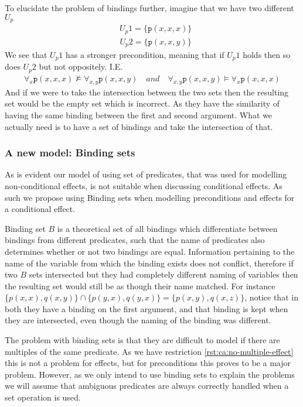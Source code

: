 \documentclass[../Master.tex]{subfiles}
\begin{document}
\begin{example}\label{ex:ca:nonbinding-intersection-model}
To elucidate the problem of bindings further, imagine that we have two different $U_p$
\begin{align*}
&U_p1 = \{ \texttt{p}(x, x, x) \}
\end{align*}
\begin{align*}
&U_p2 = \{ \texttt{p}(x, x, y) \}
\end{align*}
We see that $U_p1$ has a stronger precondition, meaning that if $U_p1$ holds then so does $U_p2$ but not oppositely. I.E.
\begin{align*}
&\forall_{x} \texttt{p}(x, x, x) \nvDash \forall_{x, y} \texttt{p}(x, x, y)  \quad and \quad
 \forall_{x, y} \texttt{p}(x, x, y) \vDash \forall_{x} \texttt{p}(x, x, x)  &
\end{align*}
And if we were to take the intersection between the two sets then the resulting set would be the empty set which is incorrect. As they have the similarity of having the same binding between the first and second argument. What we actually need is to have a set of bindings and take the intersection of that.
\end{example}

\subsubsection{A new model: Binding sets}
As is evident our model of using set of predicates, that was used for modelling non-conditional effects, is not suitable when discussing conditional effects. As such we propose using Binding sets when modelling preconditions and effects for a conditional effect.

\begin{definition}\label{thm:ca:binding-set}
	Binding set $B$ is a theoretical set of all bindings which differentiate between bindings from different predicates, such that the name of predicates also determines whether or not two bindings are equal. Information pertaining to the name of the variable from which the binding exists does not conflict, therefore if two $B$ sets intersected but they had completely different naming of variables then the resulting set would still be as though their name matched.
	For instance $\{p(x,x), q(x,y)\} \cap \{p(y,x), q(y,x)\} = \{p(x,y), q(x,z)\}$, notice that in both they have a binding on the first argument, and that binding is kept when they are intersected, even though the naming of the binding was different.
\end{definition}
The problem with binding sets is that they are difficult to model if there are multiples of the same predicate. As we have restriction \ref{rst:ca:no-multiple-effect} this is not a problem for effects, but for preconditions this proves to be a major problem. However, as we only intend to use binding sets to explain the problems we will assume that ambiguous predicates are always correctly handled when a set operation is used.
\end{document}
